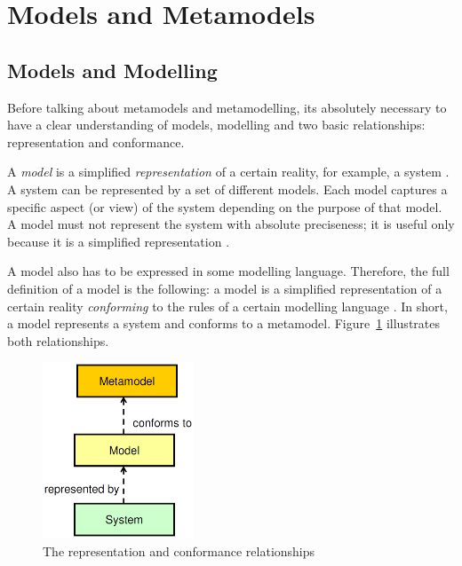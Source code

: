 \section{Models and Metamodels}

\subsection{Models and Modelling}

Before talking about metamodels and metamodelling, its absolutely necessary to have a clear understanding of models, modelling and two basic relationships: representation and conformance. 

A \textit{model} is a simplified \textit{representation} of a certain reality, for example, a system \cite{Genova09}.
A system can be represented by a set of different models.
Each model captures a specific aspect (or view) of the system depending on the purpose of that model.
A model must not represent the system with absolute preciseness; it is useful only because it is a simplified representation \cite{Genova09}.

A model also has to be expressed in some modelling language.
Therefore, the full definition of a model is the following: a model is a simplified representation of a certain reality \textit{conforming} to the rules of a certain modelling language \cite{Genova09}. In short, a model represents a system and conforms to a metamodel. Figure~\ref{figure:representation-and-conformance} illustrates both relationships.

\begin{figure}[h]
	\centering
	\includegraphics[width=0.4\textwidth]{images/representation-and-conformance-relationships.png}
	\caption{The representation and conformance relationships \cite{Genova09}}
	\label{figure:representation-and-conformance}
\end{figure}

